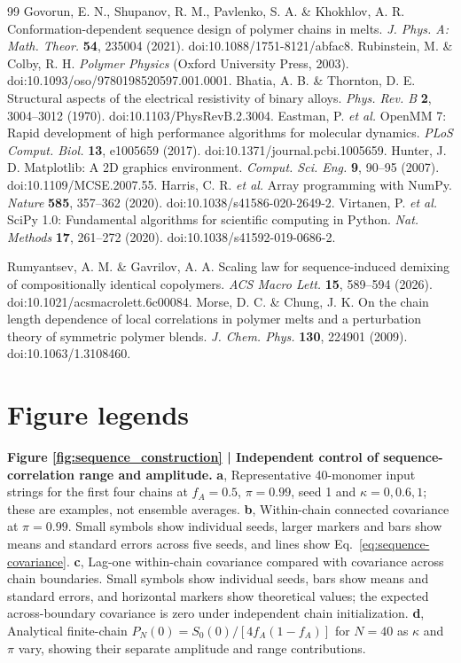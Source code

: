 \documentclass[pdflatex,sn-nature,onecolumn]{sn-jnl}
\begin{document}
\begin{thebibliography}{99}
 Govorun, E. N., Shupanov, R. M., Pavlenko, S. A. \& Khokhlov, A. R. Conformation-dependent sequence design of polymer chains in melts. \textit{J. Phys. A: Math. Theor.} \textbf{54}, 235004 (2021). doi:10.1088/1751-8121/abfac8.
 Rubinstein, M. \& Colby, R. H. \textit{Polymer Physics} (Oxford University Press, 2003). doi:10.1093/oso/9780198520597.001.0001.
 Bhatia, A. B. \& Thornton, D. E. Structural aspects of the electrical resistivity of binary alloys. \textit{Phys. Rev. B} \textbf{2}, 3004--3012 (1970). doi:10.1103/PhysRevB.2.3004.
 Eastman, P. \textit{et al.} OpenMM 7: Rapid development of high performance algorithms for molecular dynamics. \textit{PLoS Comput. Biol.} \textbf{13}, e1005659 (2017). doi:10.1371/journal.pcbi.1005659.
 Hunter, J. D. Matplotlib: A 2D graphics environment. \textit{Comput. Sci. Eng.} \textbf{9}, 90--95 (2007). doi:10.1109/MCSE.2007.55.
 Harris, C. R. \textit{et al.} Array programming with NumPy. \textit{Nature} \textbf{585}, 357--362 (2020). doi:10.1038/s41586-020-2649-2.
 Virtanen, P. \textit{et al.} SciPy 1.0: Fundamental algorithms for scientific computing in Python. \textit{Nat. Methods} \textbf{17}, 261--272 (2020). doi:10.1038/s41592-019-0686-2.

 Rumyantsev, A. M. \& Gavrilov, A. A. Scaling law for sequence-induced demixing of compositionally identical copolymers. \textit{ACS Macro Lett.} \textbf{15}, 589--594 (2026). doi:10.1021/acsmacrolett.6c00084.
 Morse, D. C. \& Chung, J. K. On the chain length dependence of local correlations in polymer melts and a perturbation theory of symmetric polymer blends. \textit{J. Chem. Phys.} \textbf{130}, 224901 (2009). doi:10.1063/1.3108460.
\end{thebibliography}
\endgroup

\clearpage
\section*{Figure legends}

\noindent\textbf{Figure \ref{fig:sequence_construction} | Independent control of sequence-correlation range and amplitude.} \textbf{a}, Representative 40-monomer input strings for the first four chains at $f_A=0.5$, $\pi=0.99$, seed 1 and $\kappa=0,0.6,1$; these are examples, not ensemble averages. \textbf{b}, Within-chain connected covariance at $\pi=0.99$. Small symbols show individual seeds, larger markers and bars show means and standard errors across five seeds, and lines show Eq.~\ref{eq:sequence-covariance}. \textbf{c}, Lag-one within-chain covariance compared with covariance across chain boundaries. Small symbols show individual seeds, bars show means and standard errors, and horizontal markers show theoretical values; the expected across-boundary covariance is zero under independent chain initialization. \textbf{d}, Analytical finite-chain $P_N(0)=S_0(0)/[4f_A(1-f_A)]$ for $N=40$ as $\kappa$ and $\pi$ vary, showing their separate amplitude and range contributions.
\end{document}

